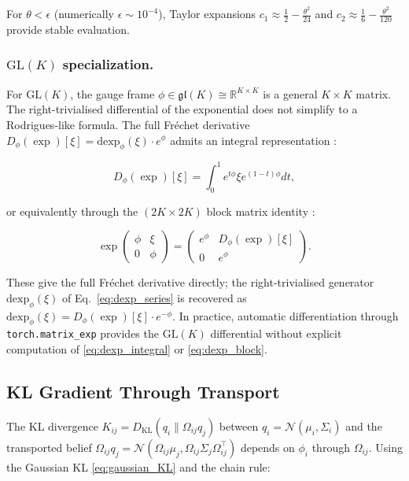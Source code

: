 \documentclass[twoside,11pt]{article}
\begin{document}
For $\theta < \epsilon$ (numerically $\epsilon \sim 10^{-4}$), Taylor expansions $c_1 \approx \frac{1}{2} - \frac{\theta^2}{24}$ and $c_2 \approx \frac{1}{6} - \frac{\theta^2}{120}$ provide stable evaluation.

\subsubsection{$\mathrm{GL}(K)$ specialization.}

For $\mathrm{GL}(K)$, the gauge frame $\phi \in \mathfrak{gl}(K) \cong \mathbb{R}^{K \times K}$ is a general $K \times K$ matrix. The right-trivialised differential of the exponential does not simplify to a Rodrigues-like formula. The full Fr\'{e}chet derivative $D_\phi(\exp)[\xi] = \mathrm{dexp}_\phi(\xi) \cdot e^\phi$ admits an integral representation \citep[Eq.~10.15]{Higham2008}:

\begin{equation}
D_\phi(\exp)[\xi] = \int_0^1 e^{t\phi} \xi e^{(1-t)\phi} dt,
\label{eq:dexp_integral}
\end{equation}

or equivalently through the $(2K \times 2K)$ block matrix identity \citep[Algorithm~10.27]{Higham2008}:

\begin{equation}
\exp \begin{pmatrix} \phi & \xi \\ 0 & \phi \end{pmatrix}
= \begin{pmatrix} e^\phi & D_\phi(\exp)[\xi] \\ 0 & e^\phi \end{pmatrix}.
\label{eq:dexp_block}
\end{equation}

These give the full Fr\'{e}chet derivative directly; the right-trivialised generator $\mathrm{dexp}_\phi(\xi)$ of Eq.~\eqref{eq:dexp_series} is recovered as $\mathrm{dexp}_\phi(\xi) = D_\phi(\exp)[\xi] \cdot e^{-\phi}$. In practice, automatic differentiation through \texttt{torch.matrix\_exp} provides the $\mathrm{GL}(K)$ differential without explicit computation of \eqref{eq:dexp_integral} or \eqref{eq:dexp_block}.

\subsection{KL Gradient Through Transport}

The KL divergence $K_{ij} = D_{\mathrm{KL}}(q_i \| \Omega_{ij} q_j)$ between $q_i = \mathcal{N}(\mu_i, \Sigma_i)$ and the transported belief $\Omega_{ij} q_j = \mathcal{N}(\Omega_{ij}\mu_j, \Omega_{ij}\Sigma_j\Omega_{ij}^\top)$ depends on $\phi_i$ through $\Omega_{ij}$. Using the Gaussian KL \eqref{eq:gaussian_KL} and the chain rule:
\end{document}
